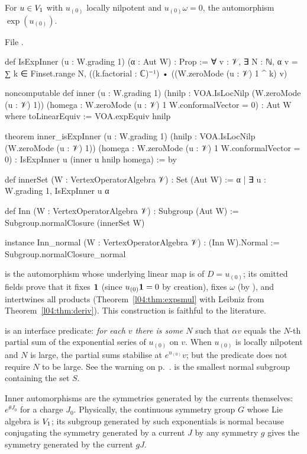 \begin{definition}\label{l04:def:inner}
For $u\in V_1$ with $u_{(0)}$ locally nilpotent and $u_{(0)}\omega = 0$, the automorphism
$\exp(u_{(0)})$.
\end{definition}
\noindent File .
\begin{leancode}
def IsExpInner (u : W.grading 1) (α : Aut W) : Prop :=
  ∀ v : 𝒱, ∃ N : ℕ, α v = ∑ k ∈ Finset.range N,
    ((k.factorial : ℂ)⁻¹) • ((W.zeroMode (u : 𝒱) 1 ^ k) v)

noncomputable def inner (u : W.grading 1)
    (hnilp : VOA.IsLocNilp (W.zeroMode (u : 𝒱) 1))
    (homega : W.zeroMode (u : 𝒱) 1 W.conformalVector = 0) : Aut W where
  toLinearEquiv := VOA.expEquiv hnilp

theorem inner_isExpInner (u : W.grading 1)
    (hnilp : VOA.IsLocNilp (W.zeroMode (u : 𝒱) 1))
    (homega : W.zeroMode (u : 𝒱) 1 W.conformalVector = 0) :
    IsExpInner u (inner u hnilp homega) := by

def innerSet (W : VertexOperatorAlgebra 𝒱) : Set (Aut W) :=
  {α | ∃ u : W.grading 1, IsExpInner u α}

def Inn (W : VertexOperatorAlgebra 𝒱) : Subgroup (Aut W) :=
  Subgroup.normalClosure (innerSet W)

instance Inn_normal (W : VertexOperatorAlgebra 𝒱) : (Inn W).Normal :=
  Subgroup.normalClosure_normal
\end{leancode}
\begin{dictionary}
 is the automorphism whose underlying linear map is  of
$D = u_{(0)}$; its omitted fields prove that it fixes $\mathbf{1}$ (since $u_{(0)}\mathbf{1} = 0$ by
creation), fixes $\omega$ (by ), and intertwines all products
(Theorem~\ref{l04:thm:expsmul} with Leibniz from Theorem~\ref{l04:thm:deriv}). This construction
is faithful to the literature.

 is an interface predicate: \emph{for each $v$ there is some $N$} such that
$\alpha v$ equals the $N$-th partial sum of the exponential series of $u_{(0)}$ on $v$. When
$u_{(0)}$ is locally nilpotent and $N$ is large, the partial sums stabilise at $e^{u_{(0)}}v$; but
the predicate does not require $N$ to be large. See the warning on p.~\pageref{l04:warn:inn}.
 is the smallest normal subgroup containing the set $S$.
\end{dictionary}
\begin{physics}
Inner automorphisms are the symmetries generated by the currents themselves: $e^{\theta J_0}$ for a
charge $J_0$. Physically, the continuous symmetry group $G$ whose Lie algebra is $V_1$; its
subgroup generated by such exponentials is normal because conjugating the symmetry generated by a
current $J$ by any symmetry $g$ gives the symmetry generated by the current $gJ$.
\end{physics}
